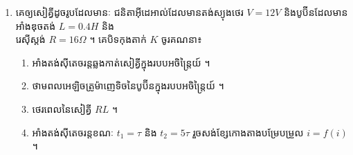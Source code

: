 \documentclass{officialexam}
\begin{document}
\begin{enumerate}[I]
\begin{enumerate}[k]
	\end{enumerate}
	\item គេឲ្យសៀគ្វីដូចរូបដែលមានៈ ជនិតាអ៊ីដេអាល់ដែលមានតង់ស្យុងថេរ $V=12V$ និងបូប៊ីនដែលមានអាំងឌុចតង់ $L=0.4H$ និង\\រេស៊ីស្តង់ $R=16\Omega$ ។ គេបិទកុងតាក់ $K$ ចូរគណនា៖ 
	\begin{enumerate}[k]
		\item អាំងតង់ស៊ីតេចរន្តឆ្លងកាត់សៀគ្វីក្នុងរបបអចិន្ត្រៃយ៍ ។
		\item ថាមពលអេឡិចត្រូម៉ាញេទិចនៃបូប៊ីនក្នុងរបបអចិន្ត្រៃយ៍ ។
		\item ថេរពេលនៃសៀគ្វី $RL$ ។
		\item អាំងតង់ស៊ីតេចរន្តខណៈ $t_1=\tau$ និង $t_2=5\tau$ រួចសង់ខ្សែកោងតាងបម្រែបម្រួល $i=f(i)$ ។
	\end{enumerate}
\end{enumerate}
\end{document}
